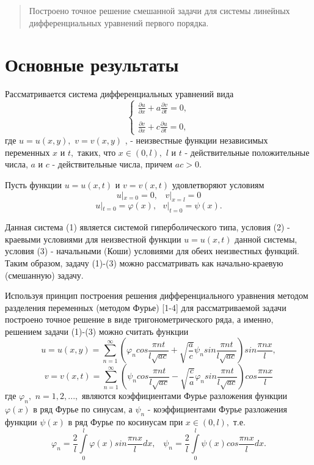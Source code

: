\begin{abstract}
Построено точное решение смешанной задачи для системы линейных дифференциальных уравнений первого порядка. 

\end{abstract}

\section{Основные результаты} %

Рассматривается система дифференциальных уравнений  вида
\begin{equation} \label{1} 
\left\lbrace \begin{array}{cc}
\displaystyle\frac{\partial u}{\partial x}+ a \frac{\partial v}{\partial t}=0, \\
\\
\displaystyle\frac{\partial v}{\partial x}+ c \frac{\partial u}{\partial t}=0,
\end{array} \right.
\end{equation}
где 
$u=u(x,y),$
$v=v(x,y)$ ,   - неизвестные функции независимых переменных 
$x$ 
 и 
 $t,$
 таких, что $x \in (0,l),$
 $l$
 и
 $t$
 - действительные положительные числа,
 $a$
 и
 $c$
 - действительные числа, причем
 $ac>0.$ 

Пусть функции
$u=u(x,t)$
и
$v=v(x,t)$
удовлетворяют условиям
\begin{equation}
u|_{x=0}=0 ,\,\,\,\,\, v|_{x=l} =0 
\end{equation}
\begin{equation}
u|_{t=0}=\varphi (x), \,\,\,\, v|_{t=0} =\psi (x).
\end{equation}

Данная система (1) является системой гиперболического типа, условия (2) - краевыми условиями для неизвестной функции 
$u=u(x,t)$
данной системы, условия (3) - начальными (Коши) условиями для обеих неизвестных функций. Таким образом, задачу (1)-(3) можно рассматривать как начально-краевую (смешанную) задачу.

Используя принцип построения решения дифференциального уравнения методом разделения переменных (методом Фурье) [1-4] для рассматриваемой задачи построено точное решение в виде тригонометрического ряда, а именно, решением задачи (1)-(3) можно считать функции 
$$u=u(x,y)=\sum\limits_{n=1}^{\infty} \left( \varphi_n cos\frac{\pi nt}{l\sqrt{ac}} + \sqrt{\frac{a}{c}} \psi_n sin \frac{\pi nt}{l\sqrt{ac}} \right) sin \frac{\pi nx}{l}, $$
$$v=v(x,t)= \sum\limits_{n=1}^{\infty} \left( \psi_n cos\frac{\pi nt}{l\sqrt{ac}} - \sqrt{\frac{c}{a}} \varphi_n sin \frac{\pi nt}{l\sqrt{ac}} \right) cos \frac{\pi nx}{l} $$
где
$\varphi_n,$ $n=1,2,...,$
являются коэффициентами Фурье разложения функции
$\varphi (x)$
в ряд Фурье по синусам, а 
$\psi_n$
 - коэффициентами Фурье разложения функции   
$\psi(x)$ 
 в ряд Фурье по косинусам при
$x \in (0,l),$
т.е.
$$\varphi_n=\frac{2}{l}\int\limits_{0}^{l} \varphi (x) sin \frac{\pi nx}{l} dx, \,\,\,\,\, \psi_n=\frac{2}{l}\int\limits_{0}^{l} \psi (x) cos \frac{\pi nx}{l} dx. $$					


